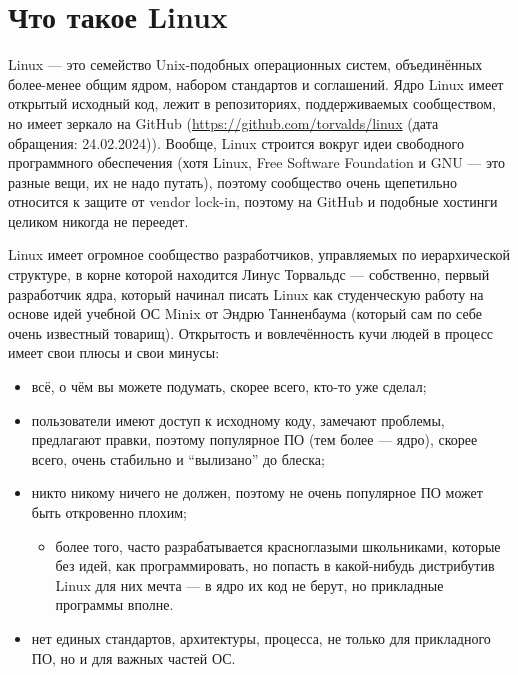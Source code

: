 \documentclass{../../text-style}
\begin{document}
\maketitle
\thispagestyle{empty}

\section{Что такое Linux}

Linux --- это семейство Unix-подобных операционных систем, объединённых более-менее общим ядром, набором стандартов и соглашений.
Ядро Linux имеет открытый исходный код, лежит в репозиториях, поддерживаемых сообществом, но имеет зеркало на GitHub (\url{https://github.com/torvalds/linux} (дата обращения: 24.02.2024)).
Вообще, Linux строится вокруг идеи свободного программного обеспечения (хотя Linux, Free Software Foundation и GNU --- это разные вещи, их не надо путать), поэтому сообщество очень щепетильно относится к защите от vendor lock-in, поэтому на GitHub и подобные хостинги целиком никогда не переедет.

Linux имеет огромное сообщество разработчиков, управляемых по иерархической структуре, в корне которой находится Линус Торвальдс --- собственно, первый разработчик ядра, который начинал писать Linux как студенческую работу на основе идей учебной ОС Minix от Эндрю Танненбаума (который сам по себе очень известный товарищ).
Открытость и вовлечённость кучи людей в процесс имеет свои плюсы и свои минусы:

\begin{itemize}
    \item всё, о чём вы можете подумать, скорее всего, кто-то уже сделал;
    \item пользователи имеют доступ к исходному коду, замечают проблемы, предлагают правки, поэтому популярное ПО (тем более --- ядро), скорее всего, очень стабильно и \enquote{вылизано} до блеска;
    \item никто никому ничего не должен, поэтому не очень популярное ПО может быть откровенно плохим;
    \begin{itemize}
        \item более того, часто разрабатывается красноглазыми школьниками, которые без идей, как программировать, но попасть в какой-нибудь дистрибутив Linux для них мечта --- в ядро их код не берут, но прикладные программы вполне.
    \end{itemize}
    \item нет единых стандартов, архитектуры, процесса, не только для прикладного ПО, но и для важных частей ОС.
\end{itemize}
\end{document}
